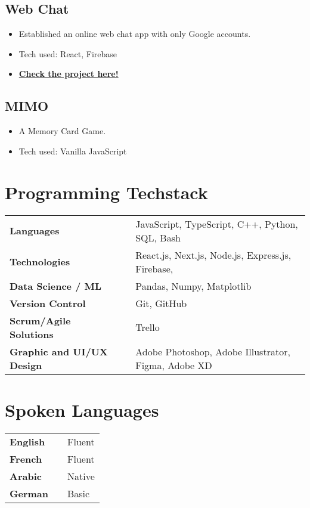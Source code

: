 \documentclass[a4,10pt]{article}
\newenvironment{zitemize}{
\begin{itemize}\itemsep0pt \parskip0pt \parsep1pt}
{\end{itemize}\vspace{-0.5cm}}
\newcommand{\hskills}[1]{
\textbf{\bfseries #1} }
\begin{document}
    
   
\subsection*{Web Chat {\normalsize\normalfont} \hfill} 
    \begin{zitemize}
        \item Established an online web chat app with only Google accounts.
        \item Tech used: React, Firebase
        \item \href{https://webchat-37001.firebaseapp.com/}{\small \textbf {Check the project here!}}
        
    \end{zitemize}
   



\subsection*{MIMO {\normalsize\normalfont} \hfill} 
    \begin{zitemize}
        \item A Memory Card Game.
                \item Tech used: Vanilla JavaScript

    \end{zitemize}



\section{Programming Techstack}
\begin{tabular}{p{11em} p{1em} p{43em}}
\hskills{Languages }&  & JavaScript, TypeScript, C++, Python, SQL, Bash \\
\hskills{Technologies} &  & React.js, Next.js, Node.js, Express.js, Firebase, \\
\hskills{Data Science / ML} &  & Pandas, Numpy, Matplotlib  \\
\hskills{Version Control} &  & Git, GitHub \\
\hskills{Scrum/Agile Solutions} &  & Trello \\
\hskills{Graphic and UI/UX Design} &  & Adobe Photoshop, Adobe Illustrator, Figma, Adobe XD 
\\


\end{tabular}

\section{Spoken Languages}
\begin{tabular}{p{11em} p{1em} p{43em}}
\hskills{English}&  &  Fluent\\
\hskills{French}&  &  Fluent\\
\hskills{Arabic}&  &  Native\\
\hskills{German}&  &  Basic\\



\end{tabular}
\vspace{-0.2cm}
\end{document}
